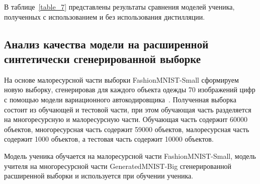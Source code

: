 В таблице~\ref{table_7} представлены результаты сравнения моделей ученика, полученных с использованием и без использования дистилляции.

\newpage
\subsection{Анализ качества модели на расширенной синтетически сгенерированной выборке}

На основе малоресурсной части выборки FashionMNIST-Small сформируем новую выборку, сгенерировав для каждого объекта одежды 70 изображений цифр с помощью модели вариационного автокодировщика~\cite{VAE}. Полученная выборка  состоит из обучающей и тестовой части, при этом обучающая часть разделяется на многоресурсную и малоресурсную части. Обучающая часть содержит 60000 объектов, многоресурсная часть содержит 59000 объектов, малоресурсная часть содержит 1000 объектов, а тестовая часть содержит 10000 объектов.

\begin{table}[h!t]
\begin{center}
\caption{Расширенная сгенерированная выборка}
\label{table_8}
\end{center}
\end{table}

Модель ученика обучается на малоресурсной части FashionMNIST-Small, модель учителя на многоресурсной части GeneratedMNIST-Big сгенерированной расширенной выборки и используется при обучении ученика.

\newpage

